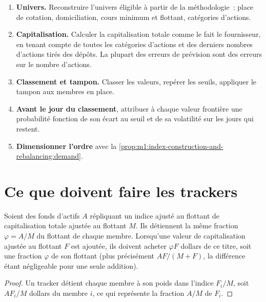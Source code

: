 \begin{method}\label{met:m1:index-construction-and-rebalancing:predict}
\begin{enumerate}
\item \textbf{Univers.} Reconstruire l'univers éligible à partir de la méthodologie~:
place de cotation, domiciliation, cours minimum et flottant, catégories d'actions.
\item \textbf{Capitalisation.} Calculer la capitalisation totale comme le fait le fournisseur,
en tenant compte de toutes les catégories d'actions et des derniers nombres d'actions tirés des dépôts. La plupart
des erreurs de prévision sont des erreurs sur le nombre d'actions.
\item \textbf{Classement et tampon.} Classer les valeurs, repérer les seuils, appliquer le tampon
aux membres en place.
\item \textbf{Avant le jour du classement}, attribuer à chaque valeur frontière une probabilité
fonction de son écart au seuil et de sa volatilité sur les jours qui
restent.
\item \textbf{Dimensionner l'ordre} avec la \cref{prop:m1:index-construction-and-rebalancing:demand}.
\end{enumerate}
\end{method}

\section{Ce que doivent faire les trackers}

\begin{proposition}\label{prop:m1:index-construction-and-rebalancing:demand}
Soient des fonds d'actifs $A$ répliquant un indice ajusté au flottant de capitalisation totale
ajustée au flottant $M$. Ils détiennent la même fraction $\varphi =
A/M$ du flottant de chaque membre. Lorsqu'une valeur de capitalisation ajustée au flottant
$F$ est ajoutée, ils doivent acheter $\varphi F$ dollars de ce titre, soit
une fraction $\varphi$ de son flottant (plus précisément $AF/(M+F)$, la différence
étant négligeable pour une seule addition).
\end{proposition}
\begin{proof}
Un tracker détient chaque membre à son poids dans l'indice $F_i/M$, soit $AF_i/M$
dollars du membre $i$, ce qui représente la fraction $A/M$ de $F_i$.
\end{proof}

